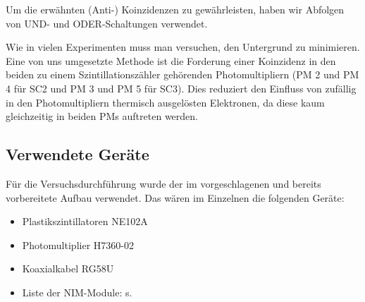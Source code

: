 Um die erwähnten (Anti-) Koinzidenzen zu gewährleisten, haben wir Abfolgen von
UND- und ODER-Schaltungen verwendet.

Wie in vielen Experimenten muss man versuchen, den Untergrund zu minimieren.
Eine von uns umgesetzte Methode ist die Forderung einer Koinzidenz in den
beiden zu einem Szintillationszähler gehörenden Photomultipliern (PM 2 und PM 4
für SC2 und PM 3 und PM 5 für SC3). Dies reduziert den Einfluss von zufällig in
den Photomultipliern thermisch ausgelösten Elektronen, da diese kaum
gleichzeitig in beiden PMs auftreten werden.

\subsection{Verwendete Geräte}

Für die Versuchsdurchführung wurde der im \cite{script} vorgeschlagenen und
bereits vorbereitete Aufbau verwendet. Das wären im Einzelnen die folgenden
Geräte:
\begin{itemize}
\item Plastikszintillatoren NE102A
\item Photomultiplier H7360-02
\item Koaxialkabel RG58U
\item Liste der NIM-Module: s. \cite[Anhang B]{script}
\end{itemize}